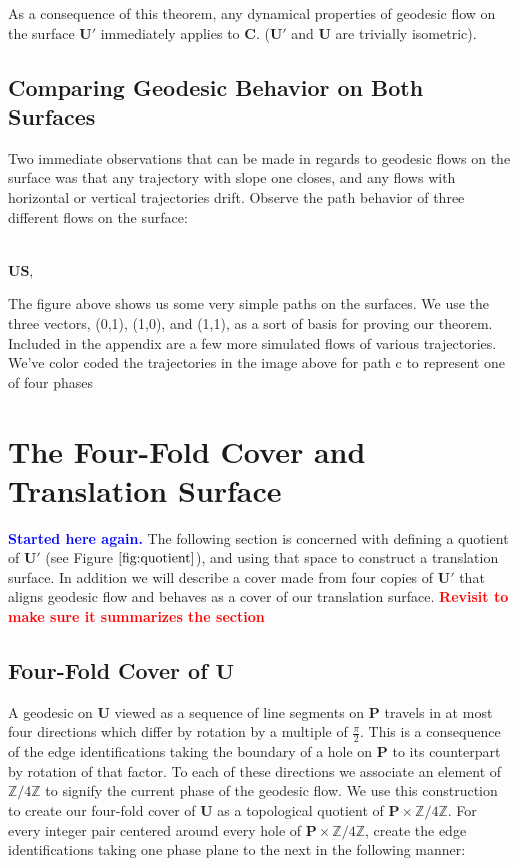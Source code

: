 \documentclass[]{article}
\newcommand{\compav}[1]{\textbf{\textcolor{blue}{#1}}}
\newcommand{\compat}[1]{\textbf{\textcolor{red}{#1}}}
\begin{document}
As a consequence of this theorem, any dynamical properties of geodesic flow on the surface $\mathbf{U}'$ immediately applies to $\mathbf{C}$. ($\mathbf{U}'$ and $\mathbf{U}$ are trivially isometric).

\subsection{Comparing Geodesic Behavior on Both Surfaces}
Two immediate observations that can be made in regards to geodesic flows on the surface was that any trajectory with slope one closes, and any flows with horizontal or vertical trajectories drift. Observe the path behavior of three different flows on the surface:

\begin{center}
\hspace{0.1in}
\raisebox{0.5in}{}
\\ $\mathbf{U}$$\mathbf{S}$,
\\ 
\end{center}

The figure above shows us some very simple paths on the surfaces. We use the three vectors, (0,1), (1,0), and (1,1), as a sort of basis for proving our theorem. Included in the appendix are a few more simulated flows of various trajectories. We've color coded the trajectories in the image above for path c to represent one of four phases

\newpage
\section{The Four-Fold Cover and Translation Surface}
\compav{Started here again.}
The following section is concerned with defining a quotient of $\mathbf{U}'$ (see Figure $\ref{fig:quotient}$), and using that space to construct a translation surface. In addition we will describe a cover made from four copies of $\mathbf{U}'$ that aligns geodesic flow and behaves as a cover of our translation surface. \compat{Revisit to make sure it summarizes the section}


\subsection{Four-Fold Cover of $\mathbf{U}$}
A geodesic on $\mathbf{U}$ viewed as a sequence of line segments on $\mathbf{P}$ travels in at most four directions which differ by rotation by a multiple of $\frac{\pi}{2}$. This is a consequence of the edge identifications taking the boundary of a hole on $\mathbf{P}$ to its counterpart by rotation of that factor. To each of these directions we associate an element of $\mathbb{Z}/4\mathbb{Z}$ to signify the current phase of the geodesic flow. We use this construction to create our four-fold cover of $\mathbf{U}$ as a topological quotient of $\mathbf{P}\times\mathbb{Z}/4\mathbb{Z}$. For every integer pair centered around every hole of $\mathbf{P}\times\mathbb{Z}/4\mathbb{Z}$, create the edge identifications taking one phase plane to the next in the following manner:
\end{document}
